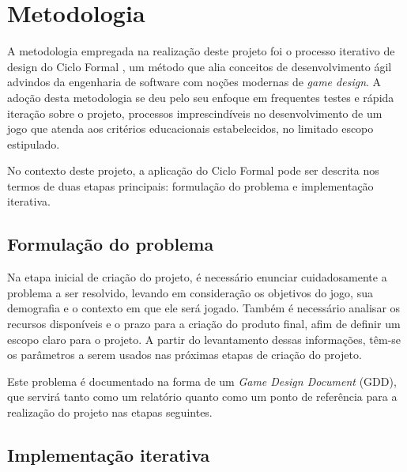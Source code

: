 
\chapter{Metodologia}\label{cap-metodologia}

A metodologia empregada na realização deste projeto foi o processo iterativo 
de design do Ciclo Formal \cite{schell:2010:art_game_design}, um método que 
alia conceitos de desenvolvimento ágil advindos da engenharia de software com 
noções modernas de \textit{game design}. A adoção desta metodologia se deu pelo seu 
enfoque em frequentes testes e rápida iteração sobre o projeto, processos
imprescindíveis no desenvolvimento de um jogo que atenda aos critérios 
educacionais estabelecidos, no limitado escopo estipulado.

No contexto deste projeto, a aplicação do Ciclo Formal pode ser descrita nos 
termos de duas etapas principais: formulação do problema e implementação iterativa.

\section{Formulação do problema}\label{sec-met-formulacao-problema}

Na etapa inicial de criação do projeto, é necessário enunciar cuidadosamente 
a problema a ser resolvido, levando em consideração os objetivos do jogo, 
sua demografia e o contexto em que ele será jogado. Também é necessário analisar 
os recursos disponíveis e o prazo para a criação do produto final, afim de 
definir um escopo claro para o projeto. A partir do levantamento dessas 
informações, têm-se os parâmetros a serem usados nas próximas etapas de criação 
do projeto.

Este problema é documentado na forma de um \textit{Game Design Document} (GDD), 
que servirá tanto como um relatório quanto como um ponto de referência para 
a realização do projeto nas etapas seguintes.

\section{Implementação iterativa}\label{sec-met-implementacao-iterativa}

